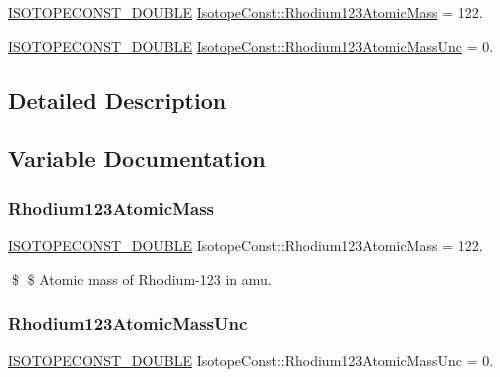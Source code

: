 \begin{DoxyCompactItemize}
\item 
\mbox{\hyperlink{group___isotope_const-_macros_ga8f45a7272ce02c0b4c65c44636ed719a}{I\+S\+O\+T\+O\+P\+E\+C\+O\+N\+S\+T\+\_\+\+D\+O\+U\+B\+LE}} \mbox{\hyperlink{group___isotope_const-_rhodium-_rh123_ga58b238659739422c3118155aeed58ea6}{Isotope\+Const\+::\+Rhodium123\+Atomic\+Mass}} = 122.
\item 
\mbox{\hyperlink{group___isotope_const-_macros_ga8f45a7272ce02c0b4c65c44636ed719a}{I\+S\+O\+T\+O\+P\+E\+C\+O\+N\+S\+T\+\_\+\+D\+O\+U\+B\+LE}} \mbox{\hyperlink{group___isotope_const-_rhodium-_rh123_ga3b4218c6c7f235a9339e21071cf50ebc}{Isotope\+Const\+::\+Rhodium123\+Atomic\+Mass\+Unc}} = 0.
\end{DoxyCompactItemize}


\subsection{Detailed Description}


\subsection{Variable Documentation}
\mbox{\label{group___isotope_const-_rhodium-_rh123_ga58b238659739422c3118155aeed58ea6}} 
\subsubsection{\texorpdfstring{Rhodium123\+Atomic\+Mass}{Rhodium123AtomicMass}}
{\footnotesize\ttfamily \mbox{\hyperlink{group___isotope_const-_macros_ga8f45a7272ce02c0b4c65c44636ed719a}{I\+S\+O\+T\+O\+P\+E\+C\+O\+N\+S\+T\+\_\+\+D\+O\+U\+B\+LE}} Isotope\+Const\+::\+Rhodium123\+Atomic\+Mass = 122.}

\$ \$ Atomic mass of Rhodium-\/123 in amu. \mbox{\label{group___isotope_const-_rhodium-_rh123_ga3b4218c6c7f235a9339e21071cf50ebc}} 
\subsubsection{\texorpdfstring{Rhodium123\+Atomic\+Mass\+Unc}{Rhodium123AtomicMassUnc}}
{\footnotesize\ttfamily \mbox{\hyperlink{group___isotope_const-_macros_ga8f45a7272ce02c0b4c65c44636ed719a}{I\+S\+O\+T\+O\+P\+E\+C\+O\+N\+S\+T\+\_\+\+D\+O\+U\+B\+LE}} Isotope\+Const\+::\+Rhodium123\+Atomic\+Mass\+Unc = 0.}

